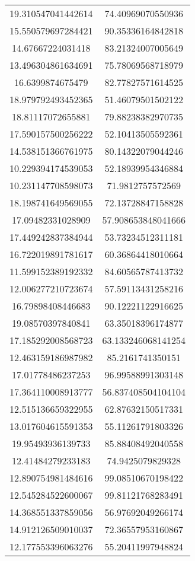 \begin{table}
\begin{tabular}{cc}
19.310547041442614 & 74.40969070550936 \\
15.550579697284421 & 90.35336164842818 \\
14.67667224031418 & 83.21324007005649 \\
13.496304861634691 & 75.78069568718979 \\
16.6399874675479 & 82.77827571614525 \\
18.979792493452365 & 51.46079501502122 \\
18.81117072655881 & 79.88238382970735 \\
17.590157500256222 & 52.10413505592361 \\
14.538151366761975 & 80.14322079044246 \\
10.229394174539053 & 52.18939954346884 \\
10.231147708598073 & 71.9812757572569 \\
18.198741649569055 & 72.13728847158828 \\
17.09482331028909 & 57.908653848041666 \\
17.449242837384944 & 53.73234512311181 \\
16.722019891781617 & 60.36864418010664 \\
11.599152389192332 & 84.60565787413732 \\
12.006277210723674 & 57.59113431258216 \\
16.79898408446683 & 90.12221122916625 \\
19.08570397840841 & 63.35018396174877 \\
17.185292008568723 & 63.133246068141254 \\
12.463159186987982 & 85.2161741350151 \\
17.01778486237253 & 96.99588991303148 \\
17.364110008913777 & 56.837408504104104 \\
12.515136659322955 & 62.87632150517331 \\
13.017604615591353 & 55.11261791803326 \\
19.95493936139733 & 85.88408492040558 \\
12.41484279233183 & 74.9425079829328 \\
12.890754981484616 & 99.08510670198422 \\
12.545284522600067 & 99.81121768283491 \\
14.368551337859056 & 56.97692049266174 \\
14.912126509010037 & 72.36557953160867 \\
12.177553396063276 & 55.20411997948824 \\

\end{tabular}
\end{table}
